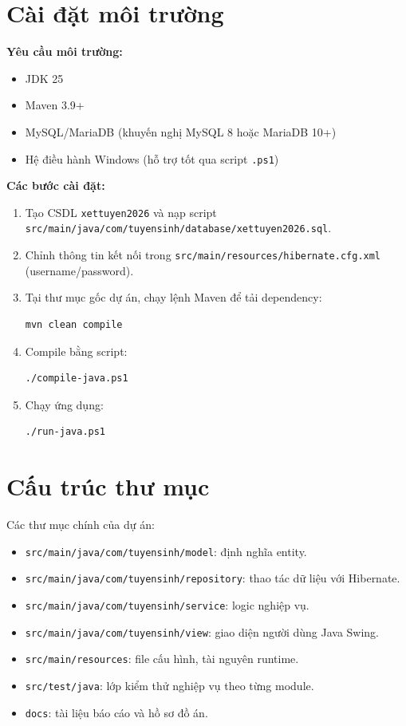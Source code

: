 \documentclass[12pt,a4paper,oneside]{report}
\begin{document}
\section{Cài đặt môi trường}
\textbf{Yêu cầu môi trường:}
\begin{itemize}
  \item JDK 25
  \item Maven 3.9+
  \item MySQL/MariaDB (khuyến nghị MySQL 8 hoặc MariaDB 10+)
  \item Hệ điều hành Windows (hỗ trợ tốt qua script \texttt{.ps1})
\end{itemize}

\textbf{Các bước cài đặt:}
\begin{enumerate}
  \item Tạo CSDL \texttt{xettuyen2026} và nạp script \texttt{src/main/java/com/tuyensinh/database/xettuyen2026.sql}.
  \item Chỉnh thông tin kết nối trong \texttt{src/main/resources/hibernate.cfg.xml} (username/password).
  \item Tại thư mục gốc dự án, chạy lệnh Maven để tải dependency:
  \begin{verbatim}
mvn clean compile
  \end{verbatim}
  \item Compile bằng script:
  \begin{verbatim}
./compile-java.ps1
  \end{verbatim}
  \item Chạy ứng dụng:
  \begin{verbatim}
./run-java.ps1
  \end{verbatim}
\end{enumerate}

\section{Cấu trúc thư mục}
Các thư mục chính của dự án:
\begin{itemize}
  \item \texttt{src/main/java/com/tuyensinh/model}: định nghĩa entity.
  \item \texttt{src/main/java/com/tuyensinh/repository}: thao tác dữ liệu với Hibernate.
  \item \texttt{src/main/java/com/tuyensinh/service}: logic nghiệp vụ.
  \item \texttt{src/main/java/com/tuyensinh/view}: giao diện người dùng Java Swing.
  \item \texttt{src/main/resources}: file cấu hình, tài nguyên runtime.
  \item \texttt{src/test/java}: lớp kiểm thử nghiệp vụ theo từng module.
  \item \texttt{docs}: tài liệu báo cáo và hồ sơ đồ án.
\end{itemize}
\end{document}
